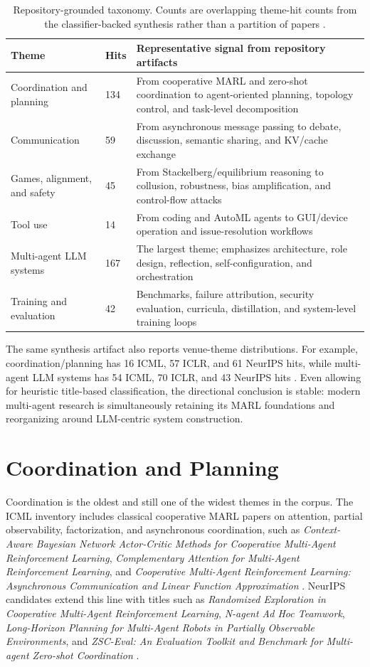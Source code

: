 \documentclass[11pt]{article}
\begin{document}
\begin{table}[ht]
\centering
\small
\begin{tabular}{p{3.2cm}p{1.5cm}p{8cm}}
\toprule
Theme & Hits & Representative signal from repository artifacts \\
\midrule
Coordination and planning & 134 & From cooperative MARL and zero-shot coordination to agent-oriented planning, topology control, and task-level decomposition \\
Communication & 59 & From asynchronous message passing to debate, discussion, semantic sharing, and KV/cache exchange \\
Games, alignment, and safety & 45 & From Stackelberg/equilibrium reasoning to collusion, robustness, bias amplification, and control-flow attacks \\
Tool use & 14 & From coding and AutoML agents to GUI/device operation and issue-resolution workflows \\
Multi-agent LLM systems & 167 & The largest theme; emphasizes architecture, role design, reflection, self-configuration, and orchestration \\
Training and evaluation & 42 & Benchmarks, failure attribution, security evaluation, curricula, distillation, and system-level training loops \\
\bottomrule
\end{tabular}
\caption{Repository-grounded taxonomy. Counts are overlapping theme-hit counts from the classifier-backed synthesis rather than a partition of papers \cite{theme_synthesis,theme_json}.}
\label{tab:taxonomy}
\end{table}

The same synthesis artifact also reports venue-theme distributions. For example, coordination/planning has 16 ICML, 57 ICLR, and 61 NeurIPS hits, while multi-agent LLM systems has 54 ICML, 70 ICLR, and 43 NeurIPS hits \cite{theme_synthesis}. Even allowing for heuristic title-based classification, the directional conclusion is stable: modern multi-agent research is simultaneously retaining its MARL foundations and reorganizing around LLM-centric system construction.

\section{Coordination and Planning}
Coordination is the oldest and still one of the widest themes in the corpus. The ICML inventory includes classical cooperative MARL papers on attention, partial observability, factorization, and asynchronous coordination, such as \emph{Context-Aware Bayesian Network Actor-Critic Methods for Cooperative Multi-Agent Reinforcement Learning}, \emph{Complementary Attention for Multi-Agent Reinforcement Learning}, and \emph{Cooperative Multi-Agent Reinforcement Learning: Asynchronous Communication and Linear Function Approximation} \cite{icml_list}. NeurIPS candidates extend this line with titles such as \emph{Randomized Exploration in Cooperative Multi-Agent Reinforcement Learning}, \emph{N-agent Ad Hoc Teamwork}, \emph{Long-Horizon Planning for Multi-Agent Robots in Partially Observable Environments}, and \emph{ZSC-Eval: An Evaluation Toolkit and Benchmark for Multi-agent Zero-shot Coordination} \cite{neurips_list}.
\end{document}
